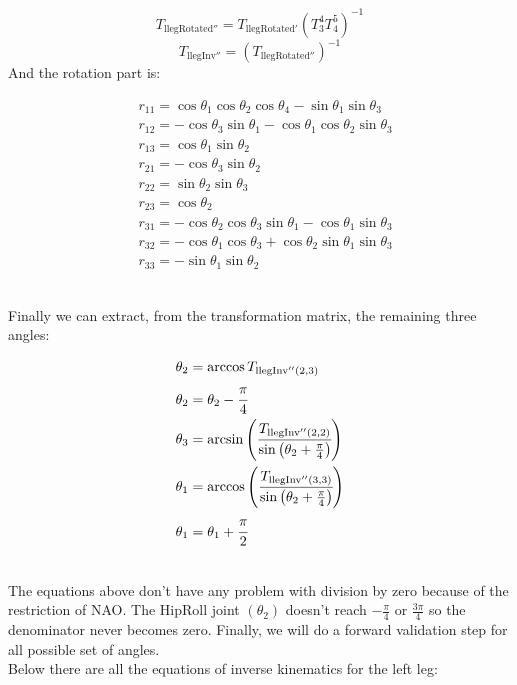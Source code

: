 \[
T_{\text{llegRotated}''} = T_{\text{llegRotated}'}\left(T^4_3T^5_4\right)^{-1}
\]
\[
T_{\text{llegInv}''} = \left(T_{\text{llegRotated}''}\right)^{-1}
\]
And the rotation part is:
\begin{small}
\begin{align*}
&r_{11} = \cos\theta_1\cos\theta_2\cos\theta_4 - \sin\theta_1\sin\theta_3\\
&r_{12} = -\cos\theta_3\sin\theta_1 - \cos\theta_1\cos\theta_2\sin\theta_3\\
&r_{13} = \cos\theta_1\sin\theta_2 \\
&r_{21} = -\cos\theta_3\sin\theta_2\\
&r_{22} = \sin\theta_2\sin\theta_3\\
&r_{23} = \cos\theta_2\\
&r_{31} = -\cos\theta_2\cos\theta_3\sin\theta_1 - \cos\theta_1\sin\theta_3\\
&r_{32} = -\cos\theta_1\cos\theta_3 + \cos\theta_2\sin\theta_1\sin\theta_3\\
&r_{33} = -\sin\theta_1\sin\theta_2
\end{align*}
\end{small}\\
Finally we can extract, from the transformation matrix, the remaining three angles:
\begin{small}
\begin{align*}
\theta_2 &= \arccos T_{\text{llegInv}''(2,3)}\\
\theta_2 &= \theta_2 - \cfrac{\pi}{4}\\
\theta_3 &= \arcsin\left(\cfrac{T_{\text{llegInv}''(2,2)}}{\sin\left(\theta_2+\frac{\pi}{4}\right)}\right)\\
\theta_1 &= \arccos\left(\cfrac{T_{\text{llegInv}''(3,3)}}{\sin\left(\theta_2+\frac{\pi}{4}\right)}\right)\\
\theta_1 &= \theta_1 + \cfrac{\pi}{2}
\end{align*}
\end{small}\\
The equations above don't have any problem with division by zero because of the restriction of NAO. The HipRoll joint \((\theta_2)\) doesn't reach \(-\frac{\pi}{4}\) or \(\frac{3\pi}{4}\) so the denominator never becomes zero. Finally, we will do a forward validation step for all possible set of angles.\\
Below there are all the equations of inverse kinematics for the left leg:
